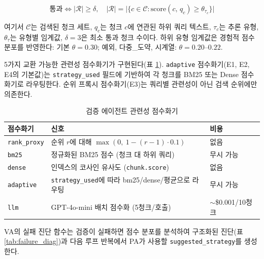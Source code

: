\documentclass[11pt, a4paper]{article}
\begin{document}
\begin{equation}
\text{통과} \iff |\mathcal{R}| \geq \delta, \quad
|\mathcal{R}| = \bigl|\{c \in \mathcal{C} : \text{score}(c,\, q_c) \geq \theta_{\tau_c}\}\bigr|
\label{eq:pass}
\end{equation}

여기서 $\mathcal{C}$는 검색된 청크 세트, $q_c$는 청크 $c$에 연관된 하위 쿼리 텍스트, $\tau_c$는 추론 유형, $\theta_{\tau}$는 유형별 임계값, $\delta=3$은 최소 통과 청크 수이다. 하위 유형 임계값은 경험적 점수 분포를 반영한다: 기본 $\theta=0.30$; 예외, 다중\_도약, 시계열: $\theta=0.20$--$0.22$.

5가지 교환 가능한 관련성 점수화기가 구현된다(표 \ref{tab:scorers}). \texttt{adaptive} 점수화기(E1, E2, E4의 기본값)는 \texttt{strategy\_used} 필드에 기반하여 각 청크를 BM25 또는 Dense 점수화기로 라우팅한다. 순위 프록시 점수화기(E3)는 쿼리별 관련성이 아닌 검색 순위에만 의존한다.

\begin{table}[htbp]
\centering
\caption{검증 에이전트 관련성 점수화기}
\label{tab:scorers}
\begin{tabular}{lll}
\toprule
\textbf{점수화기} & \textbf{신호} & \textbf{비용} \\
\midrule
\texttt{rank\_proxy}  & 순위 $r$에 대해 $\max(0,\ 1 - (r{-}1) \cdot 0.1)$ & 없음 \\
\texttt{bm25}         & 정규화된 BM25 점수 (청크 대 하위 쿼리) & 무시 가능 \\
\texttt{dense}        & 인덱스의 코사인 유사도 (\texttt{chunk.score}) & 없음 \\
\texttt{adaptive}     & \texttt{strategy\_used}에 따라 bm25/dense/평균으로 라우팅 & 무시 가능 \\
\texttt{llm}          & GPT-4o-mini 배치 점수화 (5청크/호출) & $\sim$\$0.001/10청크 \\
\bottomrule
\end{tabular}
\end{table}

VA의 실패 진단 함수는 검증이 실패하면 점수 분포를 분석하여 구조화된 진단(표 \ref{tab:failure_diag})과 다음 루프 반복에서 PA가 사용할 \texttt{suggested\_strategy}를 생성한다.
\end{document}
